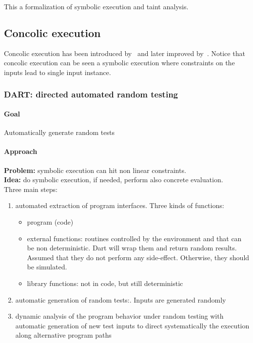 This a formalization of symbolic execution and taint analysis.

\subsection{Concolic execution}

Concolic execution has been introduced by~\cite{DART-PLDI05} and later improved by~\cite{CUTE-FSE13}. Notice that concolic execution can be seen a symbolic execution where constraints on the inputs lead to single input instance.

\subsubsection{\cite{DART-PLDI05} DART: directed automated random testing}

\paragraph{Goal}

Automatically generate random tests

\paragraph{Approach}

{\bf Problem:} symbolic execution can hit non linear constraints.\\
{\bf Idea:} do symbolic execution, if needed, perform also concrete evaluation.\\


Three main steps:
\begin{enumerate}
  \item automated extraction of program interfaces. Three kinds of functions:
    \begin{itemize}
      \item program (code)
      \item external functions: routines controlled by the environment and that can be non deterministic. Dart will wrap them and return random results. Assumed that they do not perform any side-effect. Otherwise, they should be simulated.
      \item library functions: not in code, but still deterministic
    \end{itemize}
  \item automatic generation of random tests:. Inputs are generated randomly
  \item dynamic analysis of the program behavior under random testing with automatic generation of new test inputs to direct systematically the execution along alternative program paths
\end{enumerate}

